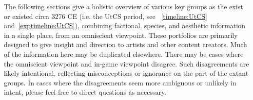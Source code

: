 \label{chapt:portfolios}
The following sections give a holistic overview of various key groups
as the exist or existed circa 3276 CE (i.e. the UtCS period, see
~\ref{timeline:UtCS} and~\ref{exptimeline:UtCS}), combining factional, species, and aesthetic
information in a single place, from an omniscient viewpoint. These
portfolios are primarily designed to give insight and direction to
artists and other content creators. Much of the information here may
be duplicated elsewhere. There may be cases where the omniscient
viewpoint and in-game viewpoint disagree. Such disagreements are
likely intentional, reflecting misconceptions or ignorance on the
part of the extant groups. In cases where the disagreements seem more
ambiguous or unlikely in intent, please feel free to direct questions
as necessary.






     

             
             
     


                  
               
                 
                 


 


 









